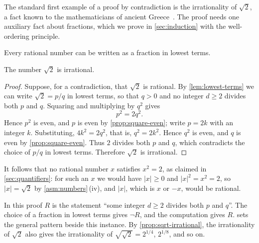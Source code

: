 The standard first example of a proof by contradiction is the irrationality of $\sqrt2$, a fact known to the mathematicians of ancient Greece~\cite{hardywright2008}. The proof needs one auxiliary fact about fractions, which we prove in \cref{sec:induction} with the well-ordering principle.

\begin{lemma}
\label{lem:lowest-terms}
Every rational number can be written as a fraction in lowest terms.
\end{lemma}

\begin{theorem}
\label{thm:sqrt2}
The number $\sqrt2$ is irrational.
\end{theorem}

\begin{proof}
Suppose, for a contradiction, that $\sqrt2$ is rational. By \cref{lem:lowest-terms} we can write $\sqrt2=p/q$ in lowest terms, so that $q>0$ and no integer $d\ge2$ divides both $p$ and $q$. Squaring and multiplying by $q^2$ gives
\[
p^2=2q^2 .
\]
Hence $p^2$ is even, and $p$ is even by \cref{prop:square-even}; write $p=2k$ with an integer $k$. Substituting, $4k^2=2q^2$, that is, $q^2=2k^2$. Hence $q^2$ is even, and $q$ is even by \cref{prop:square-even}. Thus $2$ divides both $p$ and $q$, which contradicts the choice of $p/q$ in lowest terms. Therefore $\sqrt2$ is irrational.
\end{proof}

It follows that no rational number $x$ satisfies $x^2=2$, as claimed in \cref{sec:quantifiers}: for such an $x$ we would have $|x|\ge0$ and $|x|^2=x^2=2$, so $|x|=\sqrt2$ by \cref{asm:numbers}\,(iv), and $|x|$, which is $x$ or $-x$, would be rational.

In this proof $R$ is the statement ``some integer $d\ge2$ divides both $p$ and $q$''. The choice of a fraction in lowest terms gives $\neg R$, and the computation gives $R$.  sets the general pattern beside this instance. By \cref{prop:sqrt-irrational}, the irrationality of $\sqrt2$ also gives the irrationality of $\sqrt{\sqrt2}=2^{1/4}$, $2^{1/8}$, and so on.

